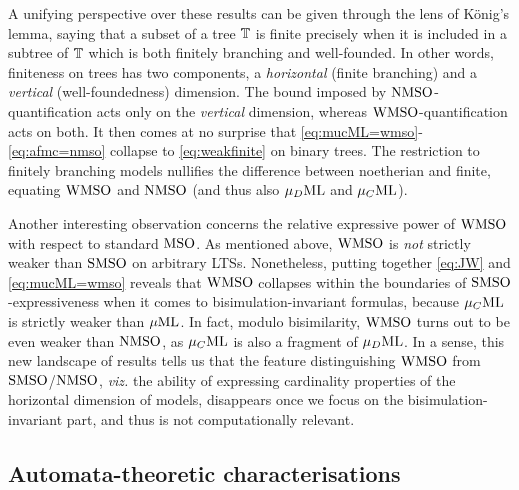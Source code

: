A unifying perspective over these results can be given through the lens of
K\"onig's lemma, saying that a subset of a tree $\mathbb{T}$ is finite precisely 
when it is included in a subtree of $\mathbb{T}$ which is both finitely branching 
and well-founded. In other words, finiteness on trees has two components, a
\emph{horizontal} (finite branching) and a \emph{vertical} (well-foundedness)
dimension. 
The bound imposed by $\mathrm{NMSO}$-quantification acts only on the \emph{vertical}
dimension, whereas $\mathrm{WMSO}$-quantification acts on both. 
It then comes at no surprise that \eqref{eq:mucML=wmso}-\eqref{eq:afmc=nmso}
collapse to \eqref{eq:weakfinite} on binary trees.
The restriction to finitely branching models nullifies the difference between
noetherian and finite, equating $\mathrm{WMSO}$ and $\mathrm{NMSO}$ (and thus also $\mu_{D}\mathrm{ML}$ and
$\mu_{C}\mathrm{ML}$).


Another interesting observation concerns the relative expressive power of 
$\mathrm{WMSO}$ with respect to standard $\mathrm{MSO}$. 
As mentioned above, $\mathrm{WMSO}$ is \emph{not} strictly weaker than $\mathrm{SMSO}$ on 
arbitrary LTSs. 
Nonetheless, putting together \eqref{eq:JW} and \eqref{eq:mucML=wmso} reveals 
that $\mathrm{WMSO}$ collapses within the boundaries of $\mathrm{SMSO}$-expressiveness when it 
comes to bisimulation-invariant formulas, because $\mu_{C}\mathrm{ML}$ is strictly weaker
than $\mu\mathrm{ML}$. 
In fact, modulo bisimilarity, $\mathrm{WMSO}$ turns out to be even weaker than $\mathrm{NMSO}$, 
as $\mu_{C}\mathrm{ML}$ is also a fragment of $\mu_{D}\mathrm{ML}$. 
In a sense, this new landscape of results tells us that the feature 
distinguishing $\mathrm{WMSO}$ from $\mathrm{SMSO}$/$\mathrm{NMSO}$, \emph{viz.} the ability of 
expressing cardinality properties of the horizontal dimension of models, 
disappears once we focus on the bisimulation-invariant part, and thus is not
computationally relevant.

\subsection{Automata-theoretic characterisations}

